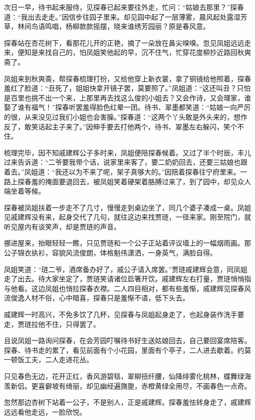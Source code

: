 \documentclass[12pt,oneside]{book}
\begin{document}
次日一早，待书起来服侍，见探春已起来要往外走，忙问：“姑娘去那里？”探春道：“我出去走走。”因信步往园子里来。却见园中起了一层薄雾，晨风起处露湿芳草，林间鸟语鸣唱，杨柳款款摇摆，晓来谁绣芳园丽？原是春风意。

探春站在杏花树下，看那花儿开的正艳，摘了一朵放在鼻尖嗅嗅。忽见凤姐远远走来，便知是来找自己的，怕凤姐笑他起的早，沉不住气，忙穿花度柳抄近路回秋爽斋了。

凤姐来到秋爽斋，帮探春梳理打扮，又给他穿上新衣裳，拿了铜镜给他照着，探春羞红了脸道：“丑死了，姐姐快拿开镜子罢，莫要照了。”凤姐道：“这还叫丑？只怕是百里也挑不出一个来，上那里再去找这么俊的小姐去？又会作诗，又会理家，谁娶了谁有福气！”探春听罢羞得脸色红晕一团。待书、翠墨都笑道：“姑娘一向严厉的很，从来没见过我们小姐也会害臊。”探春道：“这两个丫头敢是外头来的，想作反了，敢笑话起主子来了。”因伸手要去打他两个，待书、翠墨左右躲闪，笑个不住。

梳理完毕，因不知戚建辉公子多时来，凤姐便陪探春候着。又过了半个时辰，丰儿过来告诉道：“二爷要我带个话，说家里来客了，要二奶奶回去，还要三姑娘也跟着去。”凤姐道：“我还以为不来了呢，架子真够大的。”因陪着探春往宁府里来。一路上探春羞的掩面要退回去，被凤姐笑着硬架着胳膊过来了，到了园中，却见众人端坐着等候。

探春被凤姐扶着一步走不了几寸，慢慢走到桌边坐了，同几个婆子凑成一桌。凤姐见戚建辉没有来，起身交代了几句，就往这边来找贾琏，一径来家。刚至院门，就听见屋内有谈笑声，却是贾琏的声音。

挪进屋来，抬眼轻轻一瞧，只见贾琏和一个公子正站着评议墙上的一幅烟雨画。那公子锦衣纨衫，容貌风流俊朗，体格魁伟潇洒，一身英气，满脸自得。

凤姐笑道：“琏二爷，酒席备办好了，戚公子请入席罢。”贾琏戚建辉会意，同凤姐走了出去。待大家坐定了，贾琏笑请诸位启箸开饮。戚建辉左右打量，贾琏悄悄指与他看。这边凤姐也悄拉探春衣襟。二人四目相对，都有些羞惭，戚建辉见探春风流俊逸人材不俗，心中暗喜，探春只是羞惭不语，低下头去。

戚建辉一时高兴，不免多饮了几杯，见探春与凤姐起身走了，也起身装作洗手要走，贾琏拉他不住，只得罢了。

且说凤姐一路询问探春，在会芳园叮嘱待书好生送姑娘回去，自己要回宴席陪客。探春、待书走的累了，看见前面有个小花园，里面有个亭子，二人进去歇着。约莫一顿饭工夫，二人走进花丛。

只见春色无边，花开正红，香风游碧毯，翠柳扭纤腰，仙降绯雾化桃林，蝶舞绿海羡新侣。更喜僻坡有绮丽，却见幽经遍旖旎，赤橙黄绿全用尽，不画春色一点奇。

忽然那边杏树下站着一公子，不是别人，正是戚建辉。探春羞怯转身走了，戚建辉远远看他走远，一脸欣悦。
\end{document}
